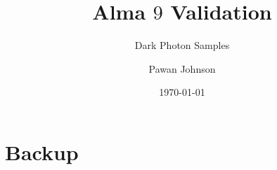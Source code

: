 \documentclass{beamer}
\title{Alma $9$ Validation}
\subtitle{Dark Photon Samples}
\author{Pawan Johnson}
\institute{University of Liverpool}
\date{\today}
\begin{document}
\begingroup
{}
\begin{frame}
    \maketitle
\end{frame}
\endgroup







\section{Backup}
\appendix
\appendsubframes
\end{document}
